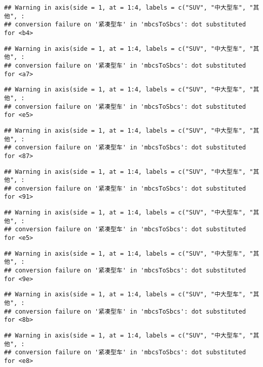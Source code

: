 \documentclass[]{article}
\begin{document}
\begin{verbatim}
## Warning in axis(side = 1, at = 1:4, labels = c("SUV", "中大型车", "其他", :
## conversion failure on '紧凑型车' in 'mbcsToSbcs': dot substituted for <b4>
\end{verbatim}

\begin{verbatim}
## Warning in axis(side = 1, at = 1:4, labels = c("SUV", "中大型车", "其他", :
## conversion failure on '紧凑型车' in 'mbcsToSbcs': dot substituted for <a7>
\end{verbatim}

\begin{verbatim}
## Warning in axis(side = 1, at = 1:4, labels = c("SUV", "中大型车", "其他", :
## conversion failure on '紧凑型车' in 'mbcsToSbcs': dot substituted for <e5>
\end{verbatim}

\begin{verbatim}
## Warning in axis(side = 1, at = 1:4, labels = c("SUV", "中大型车", "其他", :
## conversion failure on '紧凑型车' in 'mbcsToSbcs': dot substituted for <87>
\end{verbatim}

\begin{verbatim}
## Warning in axis(side = 1, at = 1:4, labels = c("SUV", "中大型车", "其他", :
## conversion failure on '紧凑型车' in 'mbcsToSbcs': dot substituted for <91>
\end{verbatim}

\begin{verbatim}
## Warning in axis(side = 1, at = 1:4, labels = c("SUV", "中大型车", "其他", :
## conversion failure on '紧凑型车' in 'mbcsToSbcs': dot substituted for <e5>
\end{verbatim}

\begin{verbatim}
## Warning in axis(side = 1, at = 1:4, labels = c("SUV", "中大型车", "其他", :
## conversion failure on '紧凑型车' in 'mbcsToSbcs': dot substituted for <9e>
\end{verbatim}

\begin{verbatim}
## Warning in axis(side = 1, at = 1:4, labels = c("SUV", "中大型车", "其他", :
## conversion failure on '紧凑型车' in 'mbcsToSbcs': dot substituted for <8b>
\end{verbatim}

\begin{verbatim}
## Warning in axis(side = 1, at = 1:4, labels = c("SUV", "中大型车", "其他", :
## conversion failure on '紧凑型车' in 'mbcsToSbcs': dot substituted for <e8>
\end{verbatim}
\end{document}
